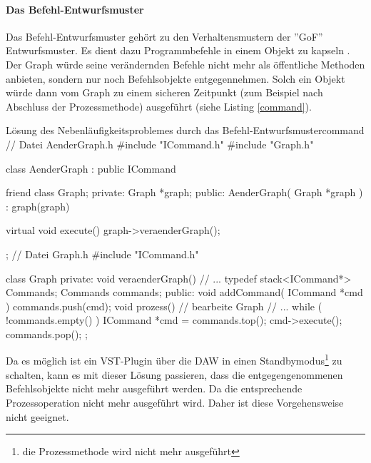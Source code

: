 \paragraph{Das Befehl-Entwurfsmuster}
Das Befehl-Entwurfsmuster gehört zu den Verhaltensmustern der ''GoF'' Entwurfsmuster.  Es dient dazu Programmbefehle in einem Objekt zu kapseln . \\
Der Graph würde seine verändernden Befehle nicht mehr als öffentliche Methoden anbieten, sondern nur noch Befehlsobjekte entgegennehmen.
Solch ein Objekt würde dann vom Graph zu einem sicheren Zeitpunkt (zum Beispiel nach Abschluss der Prozessmethode) ausgeführt (siehe Listing \ref{command}).
\NP
\begin{code}{Lösung des Nebenläufigkeitsproblemes durch das Befehl-Entwurfsmuster}{command}
// Datei AenderGraph.h
#include "ICommand.h"
#include "Graph.h"

class AenderGraph : public ICommand {
friend class Graph;
private:
	Graph *graph;
public:
	AenderGraph( Graph *graph ) : graph(graph) {
	}
	
	virtual void execute() {
		graph->veraenderGraph();
	}
};
// Datei Graph.h
#include "ICommand.h"

class Graph {
private:
	void veraenderGraph() {
		// ...
	}
	typedef stack<ICommand*> Commands;
	Commands commands;
public:
	void addCommand( ICommand *cmd ) {
		commands.push(cmd);
	}
	void prozess() {
		// bearbeite Graph
		// ...
		while ( !commands.empty() ) {
			ICommand *cmd = commands.top();
			cmd->execute();
			commands.pop();
		}
	}	 
};	
\end{code} 
Da es möglich ist ein VST-Plugin über die DAW in einen Standbymodus\footnote{die Prozessmethode wird nicht mehr ausgeführt} zu schalten, kann es mit dieser Lösung passieren, dass die entgegengenommenen Befehlsobjekte nicht mehr ausgeführt werden. Da die entsprechende Prozessoperation nicht mehr ausgeführt wird. Daher ist diese Vorgehensweise nicht geeignet.

